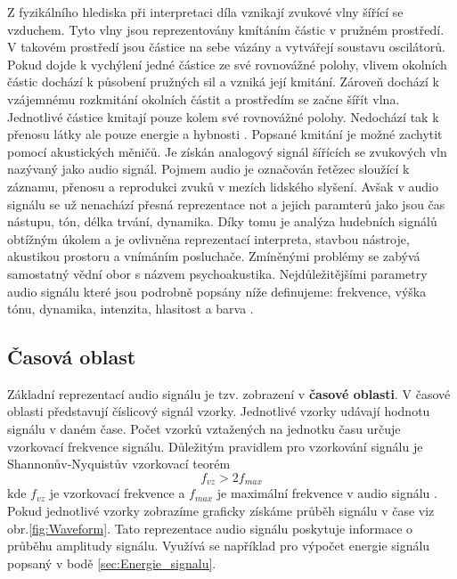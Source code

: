   Z fyzikálního hlediska při interpretaci díla vznikají zvukové vlny šířící se vzduchem.
  Tyto vlny jsou reprezentovány kmítáním částic v pružném prostředí. V takovém prostředí jsou částice na sebe vázány a vytvářejí soustavu oscilátorů. Pokud dojde k vychýlení jedné částice ze své rovnovážné polohy,
  vlivem okolních částic dochází k působení pružných sil a vzniká její kmitání. 
  Zároveň dochází k vzájemnému rozkmitání okolních částit a prostředím se začne šířít vlna. Jednotlivé částice kmitají pouze kolem své rovnovážné polohy. Nedochází tak k přenosu látky ale pouze energie a hybnosti \cite{crocker1998handbook}.
  Popsané kmitání je možné zachytit pomocí akustických měničů.
  Je získán analogový signál šířících se zvukových vln nazývaný jako audio signál.
  Pojmem audio je označován řetězec sloužící k záznamu, přenosu a reprodukci zvuků v mezích lidského slyšení.
  Avšak v audio signálu se už nenachází přesná reprezentace not a jejich paramterů jako jsou čas nástupu, tón, délka trvání, dynamika.
  Díky tomu je analýza hudebních signálů obtížným úkolem a je ovlivněna reprezentací interpreta, stavbou nástroje, akustikou prostoru a vnímáním posluchače.
  Zmíněnými problémy se zabývá samostatný vědní obor s názvem psychoakustika.
  Nejdůležitějšími parametry audio signálu které jsou podrobně popsány níže definujeme: frekvence, výška tónu, dynamika, intenzita, hlasitost a barva \cite{fundamental_of_music_processing}.

  \subsection{Časová oblast}
  Základní reprezentací audio signálu je tzv. zobrazení v \textbf{časové oblasti}.
  V časové oblasti představují číslicový signál vzorky. Jednotlivé vzorky udávají hodnotu signálu v daném čase.
  Počet vzorků vztažených na jednotku času určuje vzorkovací frekvence signálu.
  Důležitým pravidlem pro vzorkování signálu je Shannonův-Nyquistův vzorkovací teorém
  \begin{equation}
    f_{vz} > 2f_{max}
    \label{rov:vzorkovaci_teorem}
  \end{equation}
  kde $f_{vz}$ je vzorkovací frekvence a $f_{max}$ je maximální frekvence v audio signálu \cite{bracewell1978fourier}.  
  Pokud jednotlivé vzorky zobrazíme graficky získáme průběh signálu v čase viz obr.\ref{fig:Waveform}. Tato reprezentace audio signálu poskytuje informace o průběhu amplitudy signálu. Využívá se například pro výpočet energie signálu popsaný v bodě \ref{sec:Energie_signalu}.

